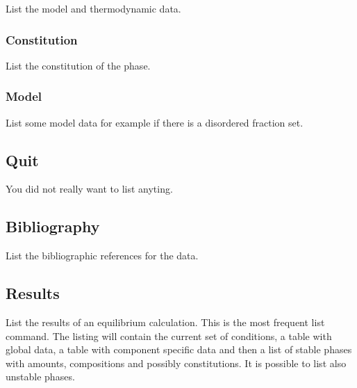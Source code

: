 \documentclass[12pt]{article}
\begin{document}
List the model and thermodynamic data.

\subsubsection{Constitution}

List the constitution of the phase.

\subsubsection{Model}

List some model data for example if there is a disordered fraction set.

\subsection{Quit}

You did not really want to list anyting.

\subsection{Bibliography}

List the bibliographic references for the data.

\subsection{Results}

List the results of an equilibrium calculation.  This is the most
frequent list command.  The listing will contain the current set of
conditions, a table with global data, a table with component specific
data and then a list of stable phases with amounts, compositions and
possibly constitutions.  It is possible to list also unstable phases.
\end{document}
